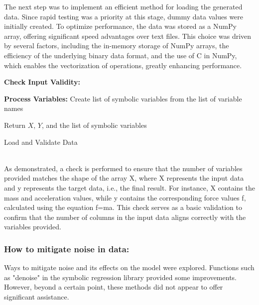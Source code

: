 \documentclass{article}
\begin{document}
The next step was to implement an efficient method for loading the generated data. Since rapid testing was a priority at this stage, dummy data values were initially created. To optimize performance, the data was stored as a NumPy array, offering significant speed advantages over text files. This choice was driven by several factors, including the in-memory storage of NumPy arrays, the efficiency of the underlying binary data format, and the use of C in NumPy, which enables the vectorization of operations, greatly enhancing performance.\\





\begin{algorithm}[H]
\SetAlgoLined
{}

\textbf{Check Input Validity:}\;

\textbf{Process Variables:}\;
Create list of symbolic variables from the list of variable names\;

Return \(X\), \(Y\), and the list of symbolic variables\;

\caption{Load and Validate Data}
\label{alg:load_data} %
\end{algorithm}\\



As demonstrated, a check is performed to ensure that the number of variables provided matches the shape of the array X, where X represents the input data and y represents the target data, i.e., the final result. For instance, X contains the mass and acceleration values, while y contains the corresponding force values f, calculated using the equation f=ma. This check serves as a basic validation to confirm that the number of columns in the input data aligns correctly with the variables provided.\\


\subsubsection{How to mitigate noise in data: }

Ways to mitigate noise and its effects on the model were explored. Functions such as "denoise" in the symbolic regression library provided some improvements. However, beyond a certain point, these methods did not appear to offer significant assistance.\\
\end{document}

